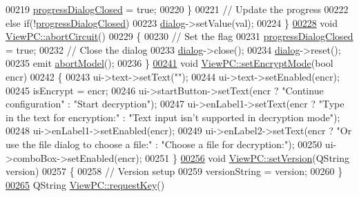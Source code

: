 \begin{DoxyCode}
00219         \hyperlink{class_view_p_c_add8c82aa2b0b934212aa5bde9277ab36}{progressDialogClosed} = \textcolor{keyword}{true};
00220     \}
00221     \textcolor{comment}{// Update the progress}
00222     \textcolor{keywordflow}{else} \textcolor{keywordflow}{if}(!\hyperlink{class_view_p_c_add8c82aa2b0b934212aa5bde9277ab36}{progressDialogClosed})
00223         \hyperlink{class_view_p_c_a31abbb470fe329b44e6ffee202b903ca}{dialog}->setValue(val);
00224 \}
\hypertarget{viewpc_8cpp_source_l00228}{}\hyperlink{class_view_p_c_ad7ba2fcf1d17862de15e32432823f7b0}{00228} \textcolor{keywordtype}{void} \hyperlink{class_view_p_c_ad7ba2fcf1d17862de15e32432823f7b0}{ViewPC::abortCircuit}()
00229 \{
00230     \textcolor{comment}{// Set the flag}
00231     \hyperlink{class_view_p_c_add8c82aa2b0b934212aa5bde9277ab36}{progressDialogClosed} = \textcolor{keyword}{true};
00232     \textcolor{comment}{// Close the dialog}
00233     \hyperlink{class_view_p_c_a31abbb470fe329b44e6ffee202b903ca}{dialog}->close();
00234     \hyperlink{class_view_p_c_a31abbb470fe329b44e6ffee202b903ca}{dialog}->reset();
00235     emit \hyperlink{class_view_p_c_aa652102ce6b5757b8eef830409c8cabf}{abortModel}();
00236 \}
\hypertarget{viewpc_8cpp_source_l00241}{}\hyperlink{class_view_p_c_a5b48951efefdc0e3039c9a4bf185320b}{00241} \textcolor{keywordtype}{void} \hyperlink{class_view_p_c_a5b48951efefdc0e3039c9a4bf185320b}{ViewPC::setEncryptMode}(\textcolor{keywordtype}{bool} encr)
00242 \{
00243     ui->text->setText(\textcolor{stringliteral}{""});
00244     ui->text->setEnabled(encr);
00245     isEncrypt = encr;
00246     ui->startButton->setText(encr ? \textcolor{stringliteral}{"Continue configuration"} : \textcolor{stringliteral}{"Start decryption"});
00247     ui->enLabel1->setText(encr ? \textcolor{stringliteral}{"Type in the text for encryption:"} : \textcolor{stringliteral}{"Text input isn't supported in
       decryption mode"});
00248     ui->enLabel1->setEnabled(encr);
00249     ui->enLabel2->setText(encr ? \textcolor{stringliteral}{"Or use the file dialog to choose a file:"} : \textcolor{stringliteral}{"Choose a file for
       decryption:"});
00250     ui->comboBox->setEnabled(encr);
00251 \}
\hypertarget{viewpc_8cpp_source_l00256}{}\hyperlink{class_view_p_c_ac05220df875b7c4f24405a5742476ebf}{00256} \textcolor{keywordtype}{void} \hyperlink{class_view_p_c_ac05220df875b7c4f24405a5742476ebf}{ViewPC::setVersion}(QString version)
00257 \{
00258     \textcolor{comment}{// Version setup}
00259     versionString = version;
00260 \}
\hypertarget{viewpc_8cpp_source_l00265}{}\hyperlink{class_view_p_c_a559c95675ec98b15451f3bca47033d9c}{00265} QString \hyperlink{class_view_p_c_a559c95675ec98b15451f3bca47033d9c}{ViewPC::requestKey}()

\end{DoxyCode}
